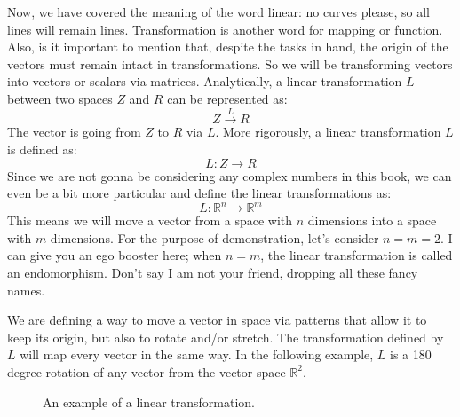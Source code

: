 \documentclass[600paper, 11pt,twoside,openany]{kdp}
\begin{document}
\indent Now, we have covered the meaning of the word linear: no curves please, so all lines will remain lines. Transformation is another word for mapping or function. Also, is it important to mention that, despite the tasks in hand, the origin of the vectors must remain intact in transformations. So we will be transforming vectors into vectors or scalars via matrices. Analytically, a linear transformation $L$ between two spaces $Z$ and $R$ can be represented as:
\[Z \stackrel{L}{\rightarrow} R\]
\indent The vector is going from $Z$ to $R$ via $L$. More rigorously, a linear transformation $L$ is defined as:
\[L:Z \rightarrow R\]
\indent Since we are not gonna be considering any complex numbers in this book, we can even be a bit more particular and define the linear transformations as:
\[L:\mathbb{R}^n \rightarrow \mathbb{R}^m\]
\indent This means we will move a vector from a space with $n$ dimensions into a space with $m$ dimensions. For the purpose of demonstration, let’s consider $n=m=2$. I can give you an ego booster here; when $n=m$, the linear transformation is called an endomorphism. Don’t say I am not your friend, dropping all these fancy names.
\par
\indent We are defining a way to move a vector in space via patterns that allow it to keep its origin, but also to rotate and/or stretch. The transformation defined by $L$ will map every vector in the same way. In the following example, $L$ is a 180 degree rotation of any vector from the vector space $\mathbb{R}^2$.  
\newpage
\begin{figure}[h!]
\begin{center}
\end{center}
\caption{An example of a linear transformation.}
\end{figure}
\end{document}

